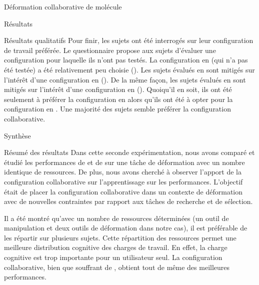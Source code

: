 \documentclass[myfrancais,ngerman,english,frenchb]{mythesis}
\begin{document}
\begin{mychapter}{Déformation collaborative de molécule}
\begin{mysection}{Résultats}
\begin{mysubsection}{Résultats qualitatifs}
				Pour finir, les sujets ont été interrogés sur leur configuration de travail préférée.
				Le questionnaire propose aux sujets d'évaluer une configuration pour laquelle ils n'ont pas testés.
				La configuration  en  (qui n'a pas été testée) a été relativement peu choisie ().
				Les sujets évalués en  sont mitigés sur l'intérêt d'une configuration  en  ().
				De la même façon, les sujets évalués en  sont mitigés sur l'intérêt d'une configuration  en  ().
				Quoiqu'il en soit, ils ont été seulement  à préférer la configuration  en  alors qu'ils ont été  à opter pour la configuration  en .
				Une majorité des sujets semble préférer la configuration collaborative.
			\end{mysubsection}
		\end{mysection}
		\begin{mysection}{Synthèse}
			\begin{mysubsection}{Résumé des résultats}
				Dans cette seconde expérimentation, nous avons comparé et étudié les performances de  et de  sur une tâche de déformation avec un nombre identique de ressources.
				De plus, nous avons cherché à observer l'apport de la configuration collaborative sur l'apprentissage sur les performances.
				L'objectif était de placer la configuration collaborative dans un contexte de déformation avec de nouvelles contraintes par rapport aux tâches de recherche et de sélection.

				Il a été montré qu'avec un nombre de ressources déterminées (un outil de manipulation et deux outils de déformation dans notre cas), il est préférable de les répartir sur plusieurs sujets.
				Cette répartition des ressources permet une meilleure distribution cognitive des charges de travail.
				En effet, la charge cognitive est trop importante pour un utilisateur seul.
				La configuration collaborative, bien que souffrant de , obtient tout de même des meilleures performances.


\end{mysubsection}
\end{mysection}
\end{mychapter}
\end{document}

